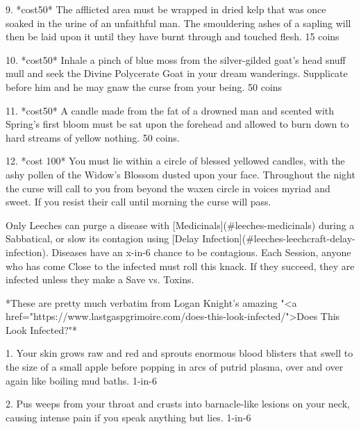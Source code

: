 9. *{cost}50* The afflicted area must be wrapped in dried kelp that was once soaked in the urine of an unfaithful man. The smouldering ashes of a sapling will then be laid upon it until they have burnt through and touched flesh. 15 coins



10. *{cost}50* Inhale a pinch of blue moss from the silver-gilded goat's head snuff mull and seek the Divine Polycerate Goat in your dream wanderings. Supplicate before him and he may gnaw the curse from your being. 50 coins





11. *{cost}50* A candle made from the fat of a drowned man and scented with Spring's first bloom must be sat upon the forehead and allowed to burn down to hard streams of yellow nothing. 50 coins.



12. *{cost} 100* You must lie within a circle of blessed yellowed candles, with the ashy pollen of the Widow's Blossom dusted upon your face. Throughout the night the curse will call to you from beyond the waxen circle in voices myriad and sweet. If you resist their call until morning the curse will pass.










Only Leeches can purge a disease with [Medicinals](#leeches-medicinals) during a Sabbatical, or slow its contagion using [Delay Infection](#leeches-leechcraft-delay-infection).  Diseases have an x-in-6 chance to be contagious. Each Session, anyone who has come Close to the infected must roll this {knack}.  If they succeed, they are infected unless they make a Save vs. Toxins.

*These are pretty much verbatim from Logan Knight's amazing "<a href="https://www.lastgaspgrimoire.com/does-this-look-infected/">Does This Look Infected?"*





1. Your skin grows raw and red and sprouts enormous blood blisters that swell to the size of a small apple before popping in arcs of putrid plasma, over and over again like boiling mud baths. 1-in-6



2. Pus weeps from your throat and crusts into barnacle-like lesions on your neck, causing intense pain if you speak anything but lies. 1-in-6



